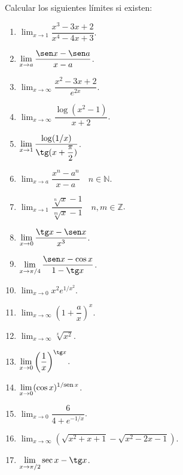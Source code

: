 {Calcular los siguientes límites si existen:
\begin{multicols}{2}
\begin{enumerate}
    \item  $\displaystyle \lim_{x\rightarrow 1}\dfrac{x^3-3x+2}{x^4-4x+3}$.

    \item  $\displaystyle \lim_{x\rightarrow a}\dfrac{\sen x-\sen a}{x-a}$.

    \item $\displaystyle \lim_{x\rightarrow\infty}\dfrac{x^2-3x+2}{e^{2x}}$.

    \item $\displaystyle \lim_{x\rightarrow\infty}\dfrac{\log(x^2-1)}{x+2}$.

    \item $\displaystyle \lim_{x\rightarrow 1}\dfrac{\log(1/x)}{\tg(x+\dfrac{\pi}{2})}$.

    \item $\displaystyle \lim_{x\rightarrow a}\dfrac{x^n-a^n}{x-a}\quad n\in \mathbb{N}$.

    \item $ \displaystyle \lim_{x\rightarrow
    1}\dfrac{\sqrt[n]{x}-1}{\sqrt[m]{x}-1}\quad n,m \in \mathbb{Z}$.

    \item $\displaystyle \lim_{x\rightarrow 0}\dfrac{\tg x-\sen x}{x^3}$.

    \item $\displaystyle \lim_{x\rightarrow \pi/4}\dfrac{\sen x-\cos x}{1-\tg x}$.

    \item $\displaystyle \lim_{x\rightarrow 0}x^2e^{1/x^2}$.

    \item $\displaystyle \lim_{x\rightarrow \infty}\left(1+\dfrac{a}{x}\right)^x$.

    \item $\displaystyle \lim_{x\rightarrow \infty} \sqrt[x]{x^2}$.

    \item $\displaystyle \lim_{x\rightarrow 0}\left(\dfrac{1}{x}\right)^{\tg x}$.

    \item $\displaystyle \lim_{x\rightarrow 0}(\cos x)^{1/\mbox{\footnotesize sen}\, x}$.

    \item $\displaystyle \lim_{x\rightarrow 0}\dfrac{6}{4+e^{-1/x}}$.

    \item $\displaystyle \lim_{x\rightarrow
    \infty}\left(\sqrt{x^2+x+1}-\sqrt{x^2-2x-1}\right)$.

    \item $\displaystyle \lim_{x\rightarrow \pi/2}\sec x-\tg x$.
\end{enumerate}
\end{multicols}
}


